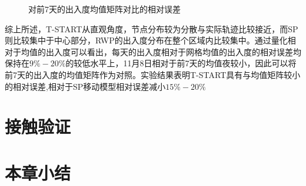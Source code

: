 \begin{figure}[ht]
\centering
{}
\caption{对前7天的出入度均值矩阵对比的相对误差}\label{figure_relative_err}
\end{figure}

综上所述，T-START从直观角度，节点分布较为分散与实际轨迹比较接近，而SP则比较集中于中心部分，RWP的出入度分布在整个区域内比较集中。通过量化相对于均值的出入度可以看出，每天的出入度相对于网格均值的出入度的相对误差均保持在$9\%-20\%$的较低水平上，11月8日相对于前7天的均值夜较小，因此可以将前7天的出入度的均值矩阵作为对照。实验结果表明T-START具有与均值矩阵较小的相对误差,相对于SP移动模型相对误差减小$15\%-20\%$
\section{接触验证}
\section{本章小结}